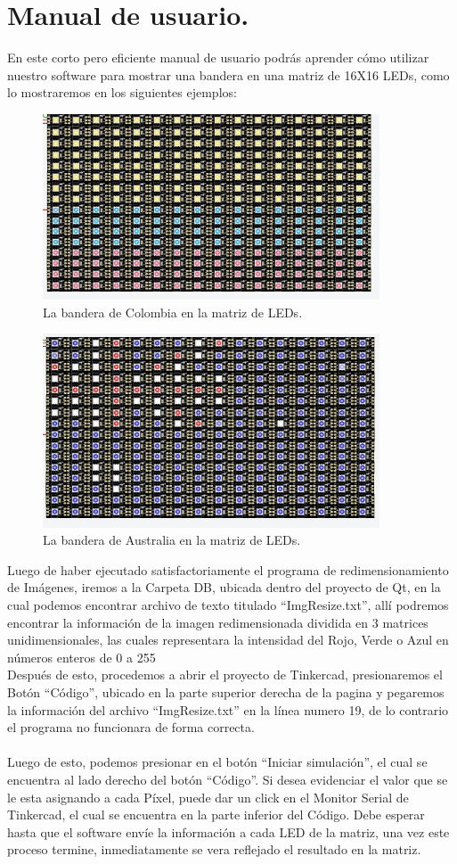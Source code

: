 \documentclass{article}
\begin{document}
\section{Manual de usuario.} \label{intro}
En este corto pero eficiente manual de usuario podrás aprender cómo utilizar nuestro software para mostrar una bandera en una matriz de 16X16 LEDs, como lo mostraremos en los siguientes ejemplos:
\begin{figure}[h]
  \includegraphics[width=10cm]{Colombia.jpg}
  \centering
  \caption{La bandera de Colombia en la matriz de LEDs.}
  \label{fig:Colombia}
\end{figure}
\begin{figure}[h]
  \includegraphics[width=10cm]{Australia.jpg}
  \centering
  \caption{La bandera de Australia en la matriz de LEDs.}
  \label{fig:Colombia}
\end{figure}
Luego de haber ejecutado satisfactoriamente el programa de redimensionamiento de Imágenes, iremos a la Carpeta DB, ubicada dentro del proyecto de Qt, en la cual podemos encontrar archivo de texto titulado “ImgResize.txt”, allí podremos encontrar la información de la imagen redimensionada dividida en 3 matrices unidimensionales, las cuales representara la intensidad del Rojo, Verde o Azul en números enteros de 0 a 255
\\
Después de esto, procedemos a abrir el proyecto de Tinkercad, presionaremos el Botón “Código”, ubicado en la parte superior derecha de la pagina y pegaremos la información del archivo “ImgResize.txt” en la línea numero 19, de lo contrario el programa no funcionara de forma correcta.
\\
\\
Luego de esto, podemos presionar en el botón “Iniciar simulación”, el cual se encuentra al lado derecho del botón “Código”.
Si desea evidenciar el valor que se le esta asignando a cada Píxel, puede dar un click en el Monitor Serial de Tinkercad, el cual se encuentra en la parte inferior del Código.
Debe esperar hasta que el software envíe la información a cada LED de la matriz, una vez este proceso termine, inmediatamente se vera reflejado el resultado en la matriz. 



\end{document}
